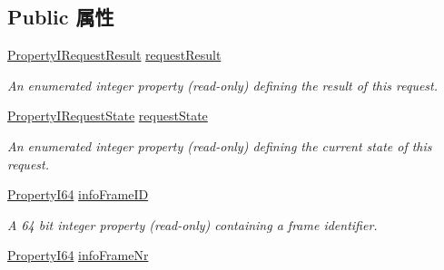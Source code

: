 \subsection*{Public 属性}
\begin{DoxyCompactItemize}
\item 
\hyperlink{group___common_interface_ga1589b24b307be9af82ada97e4588a6bd}{Property\+I\+Request\+Result} \hyperlink{classmv_i_m_p_a_c_t_1_1acquire_1_1_request_a90b174d20b986b585b37c74791726012}{request\+Result}
\begin{DoxyCompactList}\small\item\em An enumerated integer property {\bfseries }(read-\/only) defining the result of this request. \end{DoxyCompactList}\item 
\hyperlink{group___common_interface_gaa47cf118ef2a24f22680d3a3b2fcdf60}{Property\+I\+Request\+State} \hyperlink{classmv_i_m_p_a_c_t_1_1acquire_1_1_request_acf9adfbc13cad31da7c10741252ed1e1}{request\+State}
\begin{DoxyCompactList}\small\item\em An enumerated integer property {\bfseries }(read-\/only) defining the current state of this request. \end{DoxyCompactList}\item 
\hyperlink{group___common_interface_ga81749b2696755513663492664a18a893}{Property\+I64} \hyperlink{classmv_i_m_p_a_c_t_1_1acquire_1_1_request_a08460d237bdcedcbfbca11aa528969e6}{info\+Frame\+I\+D}
\begin{DoxyCompactList}\small\item\em A 64 bit integer property {\bfseries }(read-\/only) containing a frame identifier. \end{DoxyCompactList}\item 
\hypertarget{classmv_i_m_p_a_c_t_1_1acquire_1_1_request_a4e740dd9dbe32832ce1b87e417f74c7b}{\hyperlink{group___common_interface_ga81749b2696755513663492664a18a893}{Property\+I64} \hyperlink{classmv_i_m_p_a_c_t_1_1acquire_1_1_request_a4e740dd9dbe32832ce1b87e417f74c7b}{info\+Frame\+Nr}}\label{classmv_i_m_p_a_c_t_1_1acquire_1_1_request_a4e740dd9dbe32832ce1b87e417f74c7b}


\end{DoxyCompactItemize}
